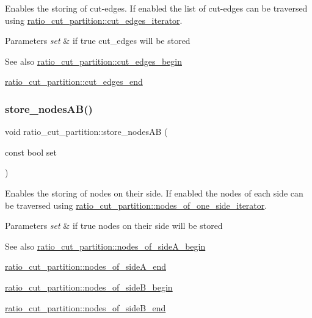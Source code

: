 Enables the storing of cut-\/edges. If enabled the list of cut-\/edges can be traversed using \mbox{\hyperlink{classratio__cut__partition_a5269af60e49810067411b085a1341adc}{ratio\+\_\+cut\+\_\+partition\+::cut\+\_\+edges\+\_\+iterator}}.


\begin{DoxyParams}{Parameters}
{\em set} & if {\ttfamily true} cut\+\_\+edges will be stored \\
\hline
\end{DoxyParams}
\begin{DoxySeeAlso}{See also}
\mbox{\hyperlink{classratio__cut__partition_a657a1d77b3b39037a52e6688674ad760}{ratio\+\_\+cut\+\_\+partition\+::cut\+\_\+edges\+\_\+begin}} 

\mbox{\hyperlink{classratio__cut__partition_a8609d76a4d74cb3b2596ac370c839fce}{ratio\+\_\+cut\+\_\+partition\+::cut\+\_\+edges\+\_\+end}} 
\end{DoxySeeAlso}
\mbox{\label{classratio__cut__partition_af0efdeab02cb235df47e2339c196051f}} 
\subsubsection{\texorpdfstring{store\+\_\+nodes\+A\+B()}{store\_nodesAB()}}
{\footnotesize\ttfamily void ratio\+\_\+cut\+\_\+partition\+::store\+\_\+nodes\+AB (\begin{DoxyParamCaption}\item[{const bool}]{set }\end{DoxyParamCaption})}

Enables the storing of nodes on their side. If enabled the nodes of each side can be traversed using \mbox{\hyperlink{classratio__cut__partition_a4f667099b56ded1bfef8f1fb4d09f81c}{ratio\+\_\+cut\+\_\+partition\+::nodes\+\_\+of\+\_\+one\+\_\+side\+\_\+iterator}}.


\begin{DoxyParams}{Parameters}
{\em set} & if {\ttfamily true} nodes on their side will be stored \\
\hline
\end{DoxyParams}
\begin{DoxySeeAlso}{See also}
\mbox{\hyperlink{classratio__cut__partition_a0c569bb7bd0a94269bd8938a2e0fce85}{ratio\+\_\+cut\+\_\+partition\+::nodes\+\_\+of\+\_\+side\+A\+\_\+begin}} 

\mbox{\hyperlink{classratio__cut__partition_a497d63a55cf326f62b97d0c77be094c7}{ratio\+\_\+cut\+\_\+partition\+::nodes\+\_\+of\+\_\+side\+A\+\_\+end}} 

\mbox{\hyperlink{classratio__cut__partition_ae36c08387ff6eae1236076cdbabf4fa5}{ratio\+\_\+cut\+\_\+partition\+::nodes\+\_\+of\+\_\+side\+B\+\_\+begin}} 

\mbox{\hyperlink{classratio__cut__partition_a838e3ab6d00155c1f3868cc920a4a8f6}{ratio\+\_\+cut\+\_\+partition\+::nodes\+\_\+of\+\_\+side\+B\+\_\+end}} 
\end{DoxySeeAlso}


